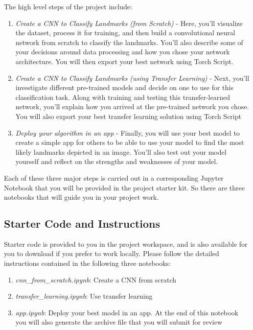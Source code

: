 The high level steps of the project include:

\begin{enumerate}
    \item \textit{Create a CNN to Classify Landmarks (from Scratch)} - Here, you'll visualize the dataset, process it for training, and then build a convolutional neural network from scratch to classify the landmarks. You'll also describe some of your decisions around data processing and how you chose your network architecture. You will then export your best network using Torch Script.
    \item \textit{Create a CNN to Classify Landmarks (using Transfer Learning)} - Next, you'll investigate different pre-trained models and decide on one to use for this classification task. Along with training and testing this transfer-learned network, you'll explain how you arrived at the pre-trained network you chose. You will also export your best transfer learning solution using Torch Script
    \item \textit{Deploy your algorithm in an app} - Finally, you will use your best model to create a simple app for others to be able to use your model to find the most likely landmarks depicted in an image. You'll also test out your model yourself and reflect on the strengths and weaknesses of your model.
\end{enumerate}
Each of these three major steps is carried out in a corresponding Jupyter Notebook that you will be provided in the project starter kit. So there are three notebooks that will guide you in your project work.

\subsection{Starter Code and Instructions}

Starter code is provided to you in the project workspace, and is also available for you to download if you prefer to work locally. Please follow the detailed instructions contained in the following three notebooks:

\begin{enumerate}
    \item \textit{cnn\_from\_scratch.ipynb}: Create a CNN from scratch
    \item \textit{transfer\_learning.ipynb}: Use transfer learning
    \item \textit{app.ipynb}: Deploy your best model in an app. At the end of this notebook you will also generate the archive file that you will submit for review
\end{enumerate}

